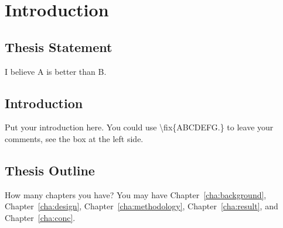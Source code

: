 \chapter{Introduction}
\label{cha:intro}


\section{Thesis Statement}
\label{sec:thesisstatement}
I believe A is better than B.

\section{Introduction}
\label{sec:problemstatement}
Put your introduction here. You could use \textbackslash fix\{ABCDEFG.\} to
leave your comments, see the box at the left side. 

\section{Thesis Outline}
\label{sec:outline}
How many chapters you have? You may have Chapter~\ref{cha:background},
Chapter~\ref{cha:design}, Chapter~\ref{cha:methodology},
Chapter~\ref{cha:result}, and Chapter~\ref{cha:conc}.